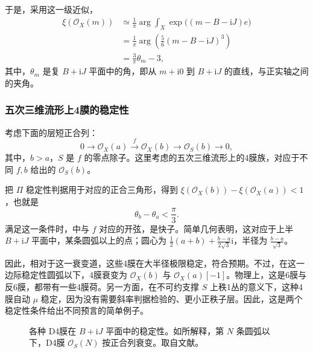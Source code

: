 于是，采用这一级近似，
\begin{equation}\label{eq:5.146}
\begin{aligned}
\xi(\mathcal{O}_X(m))
&\simeq\frac1\pi\arg\int_X\exp\bigl((m-B-\mathrm{i}J)e\bigr)\\
&=\frac1\pi\arg\!\left(\frac56(m-B-\mathrm{i}J)^3\right)\\
&=\frac3\pi\theta_m-3,
\end{aligned}
\end{equation}
其中，$\theta_m$ 是复 $B+\mathrm{i}J$ 平面中的角，即从 $m+\mathrm{i}0$ 到 $B+\mathrm{i}J$ 的直线，与正实轴之间的夹角。

\subsubsection{五次三维流形上4膜的稳定性}\label{sec:5.5.6.1}

考虑下面的层短正合列：
\begin{equation}\label{eq:5.147}
0\longrightarrow\mathcal{O}_X(a)\xrightarrow{f}\mathcal{O}_X(b)
\longrightarrow\mathcal{O}_S(b)\longrightarrow0,
\end{equation}
其中，$b>a$，$S$ 是 $f$ 的零点除子。这里考虑的五次三维流形上的4膜族，对应于不同 $f,b$ 给出的 $\mathcal{O}_S(b)$。

把 $\Pi$ 稳定性判据用于对应的正合三角形，得到 $\xi(\mathcal{O}_X(b))-\xi(\mathcal{O}_X(a))<1$，也就是
\begin{equation}\label{eq:5.148}
\theta_b-\theta_a<\frac\pi3.
\end{equation}
满足这一条件时，中与 $f$ 对应的开弦，是快子。简单几何表明，这对应于上半 $B+\mathrm{i}J$ 平面中，某条圆弧以上的点；圆心为 $\tfrac12(a+b)+\tfrac{b-a}{2\sqrt3}\mathrm{i}$，半径为 $\tfrac{b-a}{\sqrt3}$。

因此，相对于这一衰变道，这些4膜在大半径极限稳定，符合预期。不过，在这一边际稳定性圆弧以下，4膜衰变为 $\mathcal{O}_X(b)$ 与 $\mathcal{O}_X(a)[-1]$。物理上，这是6膜与反6膜，都带有一些4膜荷。另一方面，在不可约支撑 $S$ 上秩1丛的意义下，这种4膜自动 $\mu$ 稳定，因为没有需要斜率判据检验的、更小正秩子层。因此，这是两个稳定性条件给出不同预言的简单例子。
\begin{figure}[H]
\centering
{}
\caption{各种 D4膜在 $B+\mathrm{i}J$ 平面中的稳定性。如所解释，第 $N$ 条圆弧以下，D4膜 $\mathcal{O}_S(N)$ 按正合列衰变。取自文献。}\label{fig:5.8}
\end{figure}

